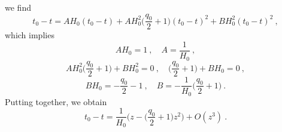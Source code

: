     we find 
    \begin{equation*}
        t_0 - t = A H_0 (t_0 - t) + A H_0^2 \Big ( \frac{q_0}{2} + 1 \Big ) (t_0 - t)^2 + B H_0^2 (t_0 - t)^2 ~,
    \end{equation*}
    which implies 
    \begin{equation*}
        A H_0 = 1 ~, \quad A = \frac{1}{H_0} ~,
    \end{equation*}
    \begin{equation*}
        A H_0^2 \Big ( \frac{q_0}{2} + 1 \Big ) + B H_0^2 = 0 ~, \quad \Big ( \frac{q_0}{2} + 1 \Big ) + B H_0  = 0 ~,
    \end{equation*}
    \begin{equation*}
        B H_0 = - \frac{q_0}{2} - 1 ~, \quad B = - \frac{1}{H_0} \Big (\frac{q_0}{2} + 1 \Big ) ~.
    \end{equation*}
    Putting together, we obtain 
    \begin{equation*}
        t_0 - t = \frac{1}{H_0} \Big ( z - \Big (\frac{q_0}{2} + 1 \Big ) z^2 \Big ) + O(z^3) ~.
    \end{equation*}

